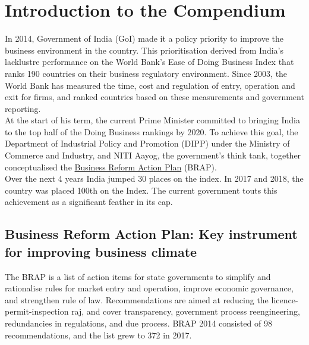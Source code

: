 \documentclass[a4paper, 12pt, twoside]{article}
\begin{document}
                    

\newpage
{}

\newpage
\section*{Introduction to the Compendium}

In 2014, Government of India (GoI) made it a policy priority to improve the business environment in the country. This prioritisation derived from India’s lacklustre performance on the World Bank’s Ease of Doing Business Index that ranks 190 countries on their business regulatory environment. Since 2003, the World Bank has measured the time, cost and regulation of entry, operation and exit for firms, and ranked countries based on these measurements and government reporting. \\

At the start of his term, the current Prime Minister committed to bringing India to the top half of the Doing Business rankings by 2020. To achieve this goal, the Department of Industrial Policy and Promotion (DIPP) under the Ministry of Commerce and Industry, and NITI Aayog, the government’s think tank, together conceptualised the \href{http://eodb.dipp.gov.in/AboutUs.aspx}{Business Reform Action Plan} (BRAP). \\

Over the next 4 years India jumped 30 places on the index. In 2017 and 2018, the country was placed 100th on the Index. The current government touts this achievement as a significant feather in its cap. 

\subsection*{Business Reform Action Plan: Key instrument for improving business climate}             

The BRAP is a list of action items for state governments to simplify and rationalise rules for market entry and operation, improve economic governance, and strengthen rule of law. Recommendations are aimed at reducing the licence-permit-inspection raj, and cover transparency, government process reengineering, redundancies in regulations, and due process. BRAP 2014 consisted of 98 recommendations, and the list grew to 372 in 2017. \\
\end{document}
